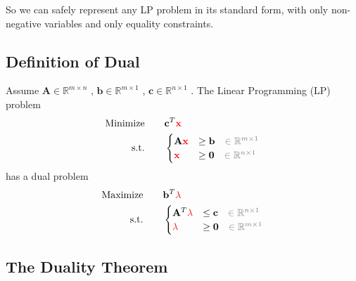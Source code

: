 \documentclass[twocolumn]{ctexart}
\begin{document}
So we can safely represent any LP problem in its standard form,
with only non-negative variables and only equality constraints.


\subsection{Definition of Dual}

Assume
$\mathbf{A} \in \mathbb{R}^{m \times n}$
,
$\mathbf{b} \in \mathbb{R}^{m \times 1}$
,
$\mathbf{c} \in \mathbb{R}^{n \times 1}$
.
The Linear Programming (LP) problem
\begin{equation}
    \begin{aligned}
        \text{Minimize} \qquad &
            \mathbf{c}^T  \mathbf{\color{red} x}
        \\
        \text{s.t.} \qquad &
            \begin{cases}
                \mathbf{A}  \mathbf{\color{red} x}  &  \geq  \mathbf{b}  {\color{gray} \quad \in \mathbb{R}^{m \times 1}}  \\
                            \mathbf{\color{red} x}  &  \geq  \mathbf{0}  {\color{gray} \quad \in \mathbb{R}^{n \times 1}}  \\
            \end{cases}
    \end{aligned}
\end{equation}
has a dual problem
\begin{equation}
    \begin{aligned}
        \text{Maximize} \qquad &
            \mathbf{b}^T  \mathbf{\color{red} \lambda}
        \\
        \text{s.t.} \qquad &
            \begin{cases}
                \mathbf{A}^T  \mathbf{\color{red} \lambda}  &  \leq  \mathbf{c}  {\color{gray} \quad \in \mathbb{R}^{n \times 1}}  \\
                              \mathbf{\color{red} \lambda}  &  \geq  \mathbf{0}  {\color{gray} \quad \in \mathbb{R}^{m \times 1}}  \\
            \end{cases}
    \end{aligned}
\end{equation}



\subsection{The Duality Theorem}




\begin{equation}
    \begin{aligned}
        \label{eq:}
    \end{aligned}
\end{equation}
\end{document}
